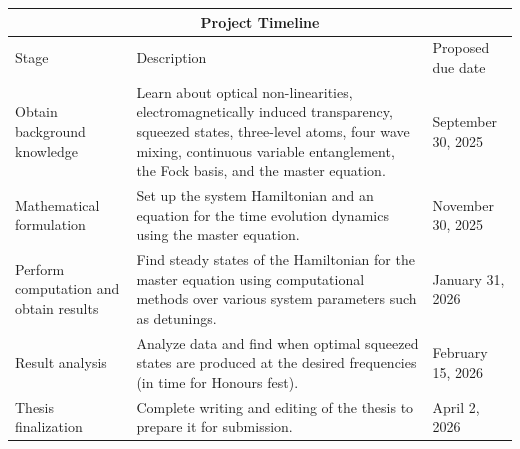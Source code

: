 \documentclass[aps,pra,showpacs,amsmath,amssymb,nofootinbib,longbibliography,superscriptaddress
]{revtex4-1}
\theoremstyle{definition}
\theoremstyle{remark}
\newcommand{\0}{\hat{0}}
\begin{document}
\begin{center}
    \begin{tabular}{ |p{4cm}||p{10cm}|p{3cm}|  }
        \hline
        \multicolumn{3}{|c|}{Project Timeline} \\
        \hline
        Stage &  Description & Proposed due date\\
        \hline
        \raggedright Obtain background knowledge & Learn about optical non-linearities, electromagnetically induced transparency, squeezed states, three-level atoms, four wave mixing, continuous variable entanglement, the Fock basis, and the master equation. & September 30, 2025\\
        \hline
        Mathematical formulation & Set up the system Hamiltonian and an equation for the time evolution dynamics using the master equation. & November 30, 2025\\
        \hline
        Perform computation and obtain results & Find steady states of the Hamiltonian for the master equation using computational methods over various system parameters such as detunings. & January 31, 2026\\
        \hline
        Result analysis & Analyze data and find when optimal squeezed states are produced at the desired frequencies (in time for Honours fest). & February 15, 2026\\
        \hline
        Thesis finalization & Complete writing and editing of the thesis to prepare it for submission. & April 2, 2026\\
        \hline
    \end{tabular}
\end{center}




\end{document}
